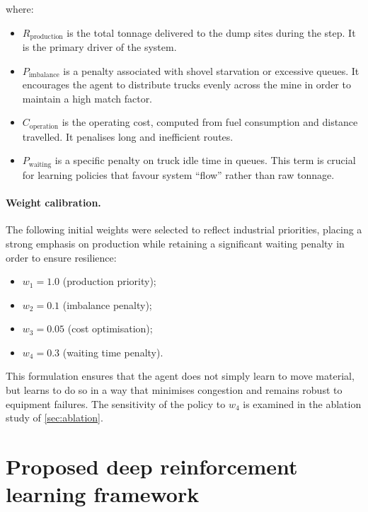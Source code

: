 \documentclass[11pt,a4paper]{article}
\begin{document}
where:

\begin{itemize}
  \item $R_{\mathrm{production}}$ is the total tonnage delivered to the dump sites during the step. It is the primary driver of the system.
  \item $P_{\mathrm{imbalance}}$ is a penalty associated with shovel starvation or excessive queues. It encourages the agent to distribute trucks evenly across the mine in order to maintain a high match factor.
  \item $C_{\mathrm{operation}}$ is the operating cost, computed from fuel consumption and distance travelled. It penalises long and inefficient routes.
  \item $P_{\mathrm{waiting}}$ is a specific penalty on truck idle time in queues. This term is crucial for learning policies that favour system ``flow'' rather than raw tonnage.
\end{itemize}

\paragraph{Weight calibration.} The following initial weights were selected to reflect industrial priorities, placing a strong emphasis on production while retaining a significant waiting penalty in order to ensure resilience:

\begin{itemize}
  \item $w_1 = 1.0$ (production priority);
  \item $w_2 = 0.1$ (imbalance penalty);
  \item $w_3 = 0.05$ (cost optimisation);
  \item $w_4 = 0.3$ (waiting time penalty).
\end{itemize}

This formulation ensures that the agent does not simply learn to move material, but learns to do so in a way that minimises congestion and remains robust to equipment failures. The sensitivity of the policy to $w_4$ is examined in the ablation study of \cref{sec:ablation}.

\section{Proposed deep reinforcement learning framework}
\label{sec:framework}
\end{document}
